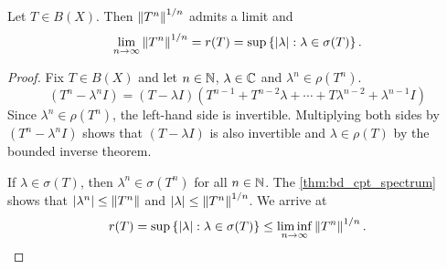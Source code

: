 \begin{theorem}
    Let $T\in B(X)$. Then $\left\lVert {T^n} \right\rVert^{1/n}$ admits a limit and 
    \begin{equation*}
        \lim_{n\to\infty}\left\lVert {T^n} \right\rVert^{1/n} = r(T) = \sup\left\{ {\left\lvert {\lambda} \right\rvert:\lambda\in\sigma(T)} \right\}.
    \end{equation*}
\end{theorem}
\begin{proof}
    Fix $T\in B(X)$ and let $n\in\mathbb{N}$, $\lambda\in\mathbb{C}$ and $\lambda^n\in\rho(T^n)$. 
    \begin{equation*}
        (T^n - \lambda^nI) = (T-\lambda I)(T^{n-1} + T^{n-2}\lambda + \cdots + T\lambda^{n-2} + \lambda^{n-1}I)
    \end{equation*}
    Since $\lambda^n\in\rho(T^n)$, the left-hand side is invertible. Multiplying 
    both sides by $(T^n-\lambda^n I)$ shows that $(T-\lambda I)$ is also invertible 
    and $\lambda\in\rho(T)$ by the bounded inverse theorem. 

    If $\lambda\in\sigma(T)$, then $\lambda^n\in\sigma(T^n)$ for all $n\in\mathbb{N}$. The
    \cref{thm:bd_cpt_spectrum} shows that $\left\lvert {\lambda^n} \right\rvert\leq\left\lVert {T^n} \right\rVert$ and 
    $\left\lvert {\lambda} \right\rvert\leq\left\lVert {T^n} \right\rVert^{1/n}$. We arrive at 
    \begin{equation*}
        r(T) = \sup\left\{ {\left\lvert {\lambda} \right\rvert:\lambda\in\sigma(T)} \right\} \leq \liminf_{n\to\infty}\left\lVert {T^n} \right\rVert^{1/n}.
    \end{equation*}


\end{proof}
